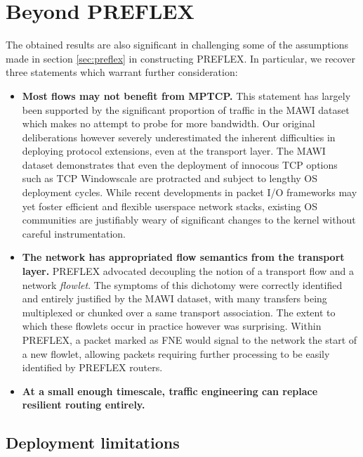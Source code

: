 \section{Beyond PREFLEX}

The obtained results are also significant in challenging some of the assumptions made in section \ref{sec:preflex} in constructing PREFLEX.
In particular, we recover three statements which warrant further consideration:

\begin{itemize}
\item{
    \textbf{Most flows may not benefit from \ac{MPTCP}.}
    This statement has largely been supported by the significant proportion of traffic in the MAWI dataset which makes no attempt to probe for more bandwidth.
    Our original deliberations however severely underestimated the inherent difficulties in deploying protocol extensions, even at the transport layer.
    The MAWI dataset demonstrates that even the deployment of innocous TCP options such as TCP Windowscale are protracted and subject to lengthy OS deployment cycles.
    While recent developments in packet I/O frameworks may yet foster efficient and flexible userspace network stacks, existing OS communities are justifiably weary of significant changes to the kernel without careful instrumentation.
}

\item{
    \textbf{The network has appropriated flow semantics from the transport layer.}
    PREFLEX advocated decoupling the notion of a transport flow and a network \emph{flowlet}.
    The symptoms of this dichotomy were correctly identified and entirely justified by the MAWI dataset, with many transfers being multiplexed or chunked over a same transport association.
    The extent to which these flowlets occur in practice however was surprising.
    Within PREFLEX, a packet marked as FNE would signal to the network the start of a new flowlet, allowing packets requiring further processing to be easily identified by PREFLEX routers.

}

\item{
    \textbf{At a small enough timescale, traffic engineering can replace resilient routing entirely.}
}

\end{itemize}

\subsection{Deployment limitations}
